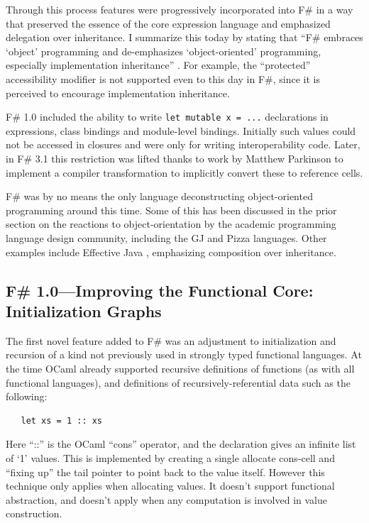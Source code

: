 \documentclass[acmsmall,screen]{acmart}
\begin{document}
Through this process features were progressively incorporated into F\# in a way that preserved the essence of the core expression language and emphasized delegation over inheritance.  I summarize this today by stating that “F\# embraces ‘object’ programming and de-emphasizes ‘object-oriented’ programming, especially implementation
inheritance” \citep{RefFSharpCodeILove}.  For example, the “protected” accessibility modifier is not supported even to this day in F\#, since it is perceived to encourage implementation inheritance.

F\# 1.0 included the ability to write \texttt{let mutable x = ...} declarations in expressions, class bindings and module-level bindings. Initially such values could not be accessed
in closures and were only for writing interoperability code.  Later, in F\# 3.1 this restriction was lifted thanks to work by Matthew Parkinson to implement a compiler transformation to implicitly convert these to reference cells.

F\# was by no means the only language deconstructing object-oriented programming around this time. Some of this has been discussed in the prior section on the reactions to object-orientation by the academic programming language design community, including the GJ and Pizza languages. Other examples include Effective Java \citep{bloch2001effective}, emphasizing composition over inheritance.



\subsection*{F\# 1.0---Improving the Functional Core: Initialization Graphs}

The first novel feature added to F\# was an adjustment to initialization and recursion of a kind not previously used in strongly typed functional languages. At the time OCaml already supported recursive definitions of functions (as with all functional languages), and definitions of recursively-referential data such as the following:
\begin{verbatim}
   let xs = 1 :: xs
\end{verbatim}

Here “::” is the OCaml “cons” operator, and the declaration gives an infinite list of ‘1’ values. This is implemented by creating a single allocate cons-cell and “fixing up” the tail pointer to point back to the value itself.  However this technique only applies when allocating values.  It doesn’t support functional abstraction, and doesn’t apply when any computation is involved in value construction.
\end{document}
